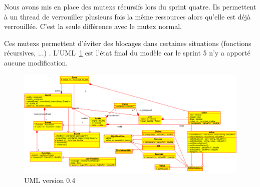Nous avons mis en place des mutexs récursifs lors du sprint quatre. Ils permettent à un thread de verrouiller plusieurs fois la même ressources alors qu'elle est déjà verrouillée. C'est la seule différence avec le mutex normal. 

Ces mutexs permettent d'éviter des blocages dans certaines situations (fonctions récursives, ...) .
L'UML~\ref{v0.4} est l'état final du modèle car le sprint 5 n'y a apporté aucune modification.
\begin{figure}[h]
\includegraphics[scale=0.4]{doc/report/uml/v04.png}
\caption{\label{v0.4} UML version 0.4}
\end{figure}

